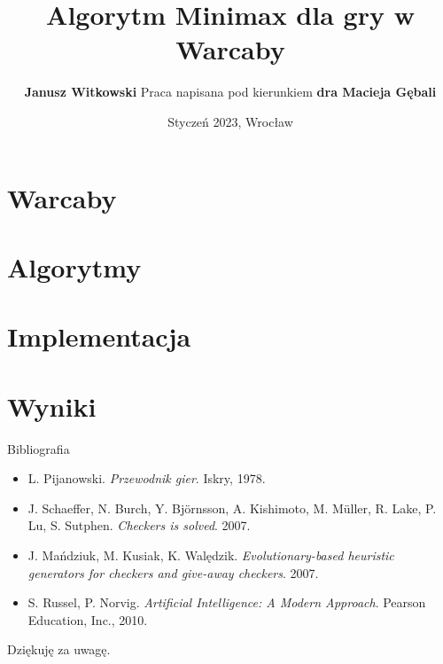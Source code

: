 \documentclass{beamer}
\title{Algorytm Minimax dla gry w Warcaby}
\author{
	\textbf{Janusz Witkowski}
	\newline \newline
	Praca napisana pod kierunkiem \textbf{dra Macieja Gębali}
}
\date{Styczeń 2023, Wrocław}
\newcommand{\myitem}{\item[$\vartriangleright$]}
\begin{document}
\begin{frame}[plain]{}
	\titlepage
\end{frame}


\section{Warcaby}

\section{Algorytmy}

\section{Implementacja}


% 
% 
% 

\section{Wyniki}



% 

% 
% 
% 

\begin{frame}{Bibliografia}
	\begin{center}
		\begin{itemize}
			\myitem L. Pijanowski. \textit{Przewodnik gier}. Iskry, 1978.
			\myitem J. Schaeffer, N. Burch, Y. Björnsson, A. Kishimoto, M. Müller, R. Lake, P. Lu, S. Sutphen. \textit{Checkers is solved}. 2007.
			\myitem J. Mańdziuk, M. Kusiak, K. Walędzik. \textit{Evolutionary-based heuristic generators for checkers and give-away checkers}. 2007.
			\myitem S. Russel, P. Norvig. \textit{Artificial Intelligence: A Modern Approach}. Pearson Education, Inc., 2010.
		\end{itemize}
	\end{center}
\end{frame}

\begin{frame}{}
	\begin{center}
		\large{Dziękuję za uwagę.}
	\end{center}
\end{frame}


\end{document}
